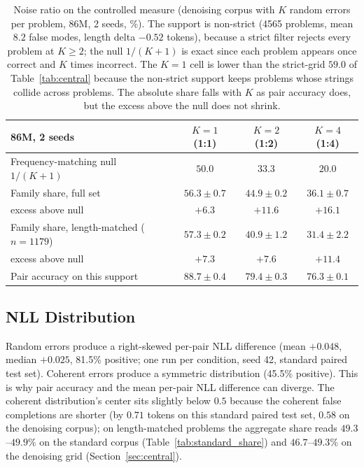 \documentclass{article}
\begin{document}
\begin{table}[ht]
\centering
\small
\begin{tabular}{lccc}
\toprule
86M, 2 seeds & $K{=}1$ (1:1) & $K{=}2$ (1:2) & $K{=}4$ (1:4) \\
\midrule
Frequency-matching null $1/(K{+}1)$ & $50.0$ & $33.3$ & $20.0$ \\
Family share, full set              & $56.3 \pm 0.7$ & $44.9 \pm 0.2$ & $36.1 \pm 0.7$ \\
\quad excess above null             & $+6.3$ & $+11.6$ & $+16.1$ \\
Family share, length-matched ($n{=}1179$) & $57.3 \pm 0.2$ & $40.9 \pm 1.2$ & $31.4 \pm 2.2$ \\
\quad excess above null             & $+7.3$ & $+7.6$ & $+11.4$ \\
Pair accuracy on this support       & $88.7 \pm 0.4$ & $79.4 \pm 0.3$ & $76.3 \pm 0.1$ \\
\bottomrule
\end{tabular}
\caption{Noise ratio on the controlled measure (denoising corpus with $K$ random errors per problem, 86M, 2 seeds, \%). The support is non-strict (4565 problems, mean $8.2$ false modes, length delta $-0.52$ tokens), because a strict filter rejects every problem at $K \geq 2$; the null $1/(K{+}1)$ is exact since each problem appears once correct and $K$ times incorrect. The $K{=}1$ cell is lower than the strict-grid $59.0$ of Table~\ref{tab:central} because the non-strict support keeps problems whose strings collide across problems. The absolute share falls with $K$ as pair accuracy does, but the excess above the null does not shrink.}
\label{tab:kratio}
\end{table}

\subsection{NLL Distribution}

Random errors produce a right-skewed per-pair NLL difference (mean $+0.048$, median $+0.025$, 81.5\% positive; one run per condition, seed 42, standard paired test set). Coherent errors produce a symmetric distribution (45.5\% positive). This is why pair accuracy and the mean per-pair NLL difference can diverge. The coherent distribution's center sits slightly below $0.5$ because the coherent false completions are shorter (by $0.71$ tokens on this standard paired test set, $0.58$ on the denoising corpus); on length-matched problems the aggregate share reads $49.3$--$49.9\%$ on the standard corpus (Table~\ref{tab:standard_share}) and $46.7$--$49.3\%$ on the denoising grid (Section~\ref{sec:central}).
\end{document}
